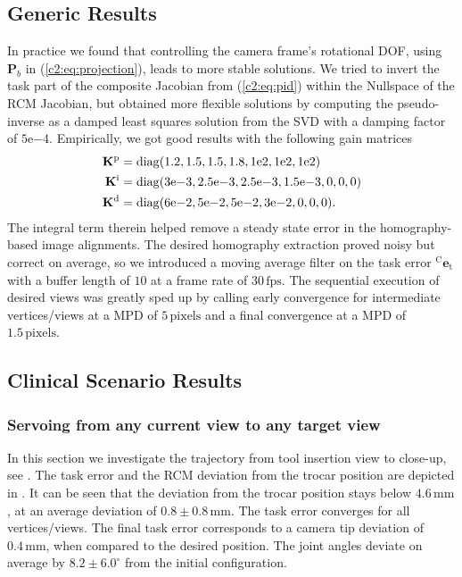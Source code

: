 \subsection{Generic Results}
\label{c2:sec:generic_res}
In practice we found that controlling the camera frame's rotational DOF, using $\mathbf{P}_b$ in (\eqref{c2:eq:projection}), leads to more stable solutions. We tried to invert the task part of the composite Jacobian from (\eqref{c2:eq:pid}) within the Nullspace of the RCM Jacobian, but obtained more flexible solutions by computing the pseudo-inverse as a damped least squares solution from the SVD with a damping factor of $5\mathrm{e}{-4}$. Empirically, we got good results with the following gain matrices
\begin{equation*}
    \begin{split}
        \mathbf{K}^\text{p} &= \operatorname{diag}(1.2, 1.5, 1.5, 1.8, 1\mathrm{e}{2}, 1\mathrm{e}{2}, 1\mathrm{e}{2}) \\
        \mathbf{K}^\text{i} &= \operatorname{diag}(3\mathrm{e}{-3}, 2.5\mathrm{e}{-3},2.5\mathrm{e}{-3}, 1.5\mathrm{e}{-3}, 0, 
    0, 0)\\
        \mathbf{K}^\text{d} &= \operatorname{diag}(6\mathrm{e}{-2}, 5\mathrm{e}{-2}, 5\mathrm{e}{-2}, 3\mathrm{e}{-2}, 0, 0, 0).
    \end{split}
\end{equation*}
The integral term therein helped remove a steady state error in the homography-based image alignments. The desired homography extraction proved noisy but correct on average, so we introduced a moving average filter on the task error $^\text{C}\mathbf{e}_\text{t}$ with a buffer length of $10$ at a frame rate of $30\,\text{fps}$. The sequential execution of desired views was greatly sped up by calling early convergence for intermediate vertices/views at a MPD of $5\,\text{pixels}$ and a final convergence at a MPD of $1.5\,\text{pixels}$. 

\subsection{Clinical Scenario Results}
\label{c2:sec:clin_res}
\subsubsection{Servoing from any current view to any target view}
\label{c2:sec:clin_res_any}

In this section we investigate the trajectory from tool insertion view to close-up, see . The task error and the RCM deviation from the trocar position are depicted in . It can be seen that the deviation from the trocar position stays below $4.6\,\text{mm}$, at an average deviation of $0.8\pm0.8\,\text{mm}$. The task error converges for all vertices/views. The final task error corresponds to a camera tip deviation of $0.4\,\text{mm}$, when compared to the desired position. The joint angles deviate on average by $8.2\pm6.0^\circ$ from the initial configuration.

